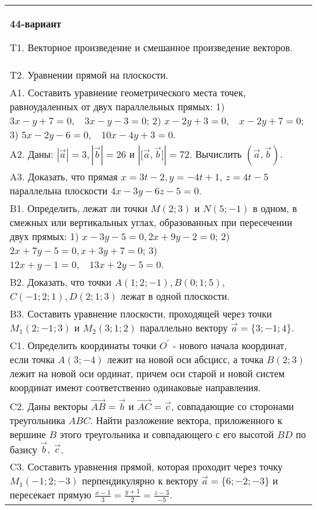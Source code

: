 \documentclass{article}
\begin{document}
\begin{tabular}{m{17cm}}
\textbf{44-вариант}
\newline

T1. 
Векторное произведение и смешанное произведение векторов.
 \\
T2. Уравнении прямой на плоскости.
 \\
A1. 
Составить уравнение геометрического места точек, равноудаленных от двух параллельных прямых: 1) \(3x - y + 7 = 0,\ \ \ \ 3x - y - 3 = 0\); 2) \(x - 2y + 3 = 0,\ \ \ \ x - 2y + 7 = 0\); 3) \(5x - 2y - 6 = 0,\ \ \ \ 10x - 4y + 3 = 0\).
 \\
A2. 
Даны: \(|\overrightarrow{a}| = 3,|\overrightarrow{b}| = 26\) и \(|\lbrack\overrightarrow{a},\overrightarrow{b}\rbrack| = 72\). Вычислить \(\left( \overrightarrow{a},\overrightarrow{b} \right)\).
 \\
A3. 
Доказать, что прямая \(x = 3t - 2,y = - 4t + 1\), \(z = 4t - 5\) параллельна плоскости \(4x - 3y - 6z - 5 = 0\).
 \\
B1. 
Определить, лежат ли точки \(M(2;3)\) и \(N(5; - 1)\) в одном, в смежных или вертикальных углах, образованных при пересечении двух прямых: 1) \(x - 3y - 5 = 0,2x + 9y - 2 = 0\); 2) \(2x + 7y - 5 = 0,x + 3y + 7 = 0\); 3) \(12x + y - 1 = 0,\ \ \ \ 13x + 2y - 5 = 0\).
 \\
B2. 
Доказать, что точки \(A(1;2; - 1),B(0;1;5)\), \(C( - 1;2;1),D(2;1;3)\) лежат в одной плоскости.
 \\
B3. 
Составить уравнение плоскости, проходящей через точки \(M_{1}(2; - 1;3)\) и \(M_{2}(3;1;2)\) параллельно вектору \(\overrightarrow{a} = \{ 3; - 1;4\}\).
 \\
C1. 
Определить координаты точки \(O^{'}\) - нового начала координат, если точка \(A(3; - 4)\) лежит на новой оси абсцисс, а точка \(B(2;3)\) лежит на новой оси ординат, причем оси старой и новой систем координат имеют соответственно одинаковые направления.
 \\
C2. 
Даны векторы \(\overrightarrow{AB} = \overrightarrow{b}\) и \(\overrightarrow{AC} = \overrightarrow{c}\), совпадающие со сторонами треугольника \(ABC\). Найти разложение вектора, приложенного к вершине \(B\) этого треугольника и совпадающего с его высотой \(BD\) по базису \(\overrightarrow{b},\ \overrightarrow{c}\).
 \\
C3. 
Составить уравнения прямой, которая проходит через точку \(M_{1}( - 1;2; - 3)\) перпендикулярно к вектору \(\overrightarrow{a} = \{ 6; - 2; - 3\}\) и пересекает прямую \(\frac{x - 1}{3} = \frac{y + 1}{2} = \frac{z - 3}{- 5}\).
 \\

\end{tabular}
\vspace{1cm}
\end{document}
